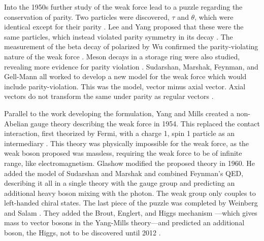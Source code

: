 Into the 1950s further study of the weak force lead to a puzzle regarding the conservation of parity.  Two particles were discovered, \ensuremath{\tau} and \ensuremath{\theta}, which were identical except for their parity \cite{osti_4356004}.  Lee and Yang proposed that these were the same particles, which instead violated parity symmetry in its decay \cite{PhysRev.104.254}.  The measurement of the beta decay of polarized \cobaltsixty by Wu confirmed the parity-violating nature of the weak force \cite{articlePARITYTEST}.  Meson decays in a storage ring were also studied, revealing more evidence for parity violation \cite{articlePARITYFAIL}.  Sudarshan, Marshak, Feynman, and Gell-Mann all worked to develop a new model for the weak force which would include parity-violation.  This was the \vminusa  model, vector minus axial vector. Axial vectors do not transform the same under parity as regular vectors \cite{1898KNAB1427L}\cite{PhysRev.109.193}.

Parallel to the work developing the \vminusa formulation, Yang and Mills created a non-Abelian gauge theory describing the weak force in 1954.  This replaced the contact interaction, first theorized by Fermi, with a charge 1, spin 1 particle as an intermediary \cite{PhysRev.96.191}.  This theory was physically impossible for the weak force, as the weak boson proposed was massless, requiring the weak force to be of infinite range, like electromagnetism.  Glashow modified the proposed theory in 1960.  He added the \vminusa model of Sudarshan and Marshak and combined Feynman's QED, describing it all in a single theory with the gauge group \SUtwoUone \cite{GLASHOW1961579} and predicting an additional heavy boson mixing with the photon.  The weak \SUtwoL group only couples to left-handed chiral states.  The last piece of the puzzle was completed by Weinberg and Salam \cite{PhysRevLett.19.1264}\cite{nla.cat-vn956113}.  They added the Brout, Englert, and Higgs mechanism \cite{PhysRevLett.13.321}\cite{PhysRevLett.13.508} ---which gives mass to vector bosons in the Yang-Mills theory---and predicted an additional boson, the Higgs, not to be discovered until 2012 \cite{higgs2012ATLAS}\cite{higgs2012CMS}.

